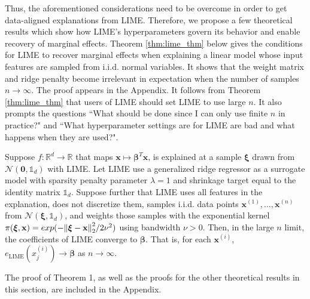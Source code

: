 \documentclass[mnsc,blindrev]{informs3}
\begin{document}
             Thus, the aforementioned  considerations need to be overcome in order to get data-aligned explanations from LIME. Therefore, we propose a few theoretical results which show how LIME's hyperparameters govern its behavior and enable recovery of marginal effects. Theorem \ref{thm:lime_thm} below gives the conditions for LIME to recover marginal effects when explaining a linear model whose input features are sampled from i.i.d. normal variables. It shows that the weight matrix and ridge penalty become irrelevant in expectation when the number of samples $n\rightarrow \infty$. The proof appears in the Appendix. It follows from Theorem \ref{thm:lime_thm} that users of LIME should set LIME to use large $n$. It also prompts the questions ``What should be done since I can only use finite $n$ in practice?" and ``What hyperparameter settings are for LIME are bad and what happens when they are used?". 
            \begin{theorem}
                \label{thm:lime_thm}
                Suppose $f:\mathbb{R}^d\rightarrow \mathbb{R}$ that maps $\mathbf{x} \mapsto \boldsymbol{\beta}^T \mathbf{x}$, is explained at a sample $\boldsymbol{\xi}$ drawn from $\mathcal{N}(\mathbf{0}, \mathds{1}_d)$ with LIME. Let LIME use a generalized ridge regressor as a surrogate model with sparsity penalty parameter $\lambda=1$ and shrinkage target equal to the identity matrix $\mathds{1}_d$. Suppose further that LIME uses all features in the explanation, does not discretize them, samples i.i.d. data points $\mathbf{x}^{(1)},\ldots,\mathbf{x}^{(n)}$ from $ \mathcal{N}(\boldsymbol{\xi}, \mathds{1}_d)$, and weights those samples with the exponential kernel $\pi(\boldsymbol{\xi},\mathbf{x}) = exp(-\norm{\boldsymbol{\xi}-\mathbf{x}}_2^2/2\nu^2)$ using bandwidth $\nu>0$. Then, in the large $n$ limit, the coefficients of LIME converge to $\boldsymbol{\beta}$. That is, for each $\mathbf{x}^{(i)}$, $e_{\text{LIME}}(x^{(i)}_j) \rightarrow \boldsymbol{\beta}$
                as $n \rightarrow \infty$.
            \end{theorem}
The proof of Theorem 1, as well as the proofs for the other theoretical results in this section, are included in the Appendix.
             
\end{document}
